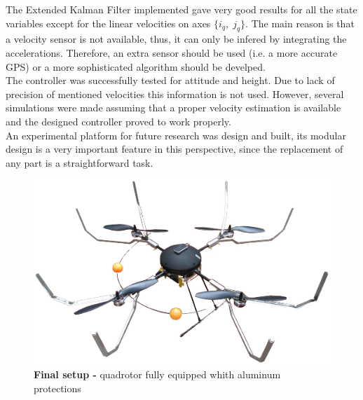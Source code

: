 \documentclass[conference]{IEEEtran}
\begin{document}
The Extended Kalman Filter implemented gave very good results for all the state variables except for the linear velocities on axes $\{i_q,\;j_q\}$. The main reason is that a velocity sensor is not available, thus, it can only be infered by integrating the accelerations. Therefore, an extra sensor should be used (i.e. a more accurate GPS) or a more sophisticated algorithm should be develped. \\

The controller was successfully tested for attitude and height. Due to lack of precision of mentioned velocities this information is not used. However, several simulations were made assuming that a proper velocity estimation is available and the designed controller proved to work properly.\\

An experimental platform for future research was design and built, its modular design is a very important feature in this perspective, since the replacement of any part is a straightforward task.
 




\begin{figure}[h]
	\centering
	\includegraphics[width=1\columnwidth]{./pics_paper/tito.png}
	\caption{\textbf{Final setup -} quadrotor fully equipped whith aluminum protections}
	\label{fig:tito}
\end{figure}
\end{document}
